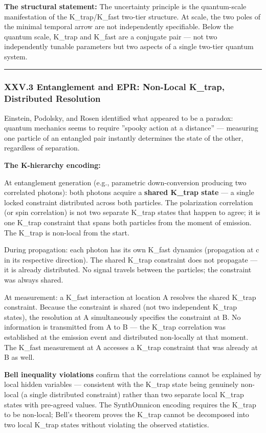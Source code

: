 \documentclass[12pt,a4paper]{article}
\begin{document}
\textbf{The structural statement:} The uncertainty principle is the quantum-scale manifestation of the K\_trap/K\_fast two-tier structure. At \hbar scale, the two poles of the minimal temporal arrow are not independently specifiable. Below the quantum scale, K\_trap and K\_fast are a conjugate pair --- not two independently tunable parameters but two aspects of a single two-tier quantum system.

\begin{center}
\rule{0.5\textwidth}{0.4pt}
\end{center}

\subsubsection{XXV.3 Entanglement and EPR: Non-Local K\_trap, Distributed Resolution}

Einstein, Podolsky, and Rosen identified what appeared to be a paradox: quantum mechanics seems to require ''spooky action at a distance'' --- measuring one particle of an entangled pair instantly determines the state of the other, regardless of separation.

\textbf{The K-hierarchy encoding:}

At entanglement generation (e.g., parametric down-conversion producing two correlated photons): both photons acquire a \textbf{shared K\_trap state} --- a single locked constraint distributed across both particles. The polarization correlation (or spin correlation) is not two separate K\_trap states that happen to agree; it is one K\_trap constraint that spans both particles from the moment of emission. The K\_trap is non-local from the start.

During propagation: each photon has its own K\_fast dynamics (propagation at c in its respective direction). The shared K\_trap constraint does not propagate --- it is already distributed. No signal travels between the particles; the constraint was always shared.

At measurement: a K\_fast interaction at location A resolves the shared K\_trap constraint. Because the constraint is shared (not two independent K\_trap states), the resolution at A simultaneously specifies the constraint at B. No information is transmitted from A to B --- the K\_trap correlation was established at the emission event and distributed non-locally at that moment. The K\_fast measurement at A accesses a K\_trap constraint that was already at B as well.

\textbf{Bell inequality violations} confirm that the correlations cannot be explained by local hidden variables --- consistent with the K\_trap state being genuinely non-local (a single distributed constraint) rather than two separate local K\_trap states with pre-agreed values. The SynthOmnicon encoding requires the K\_trap to be non-local; Bell's theorem proves the K\_trap cannot be decomposed into two local K\_trap states without violating the observed statistics.
\end{document}
